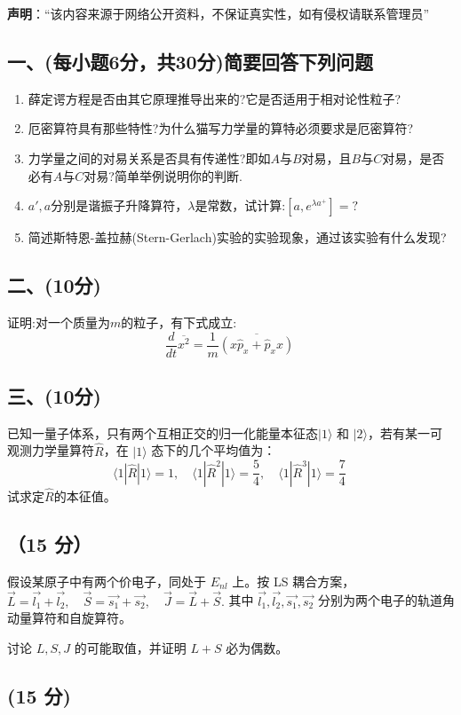 
\textbf{声明}：“该内容来源于网络公开资料，不保证真实性，如有侵权请联系管理员”

\subsection{一、(每小题6分，共30分)简要回答下列问题}
\begin{enumerate}
\item 薛定谔方程是否由其它原理推导出来的?它是否适用于相对论性粒子?
\item 厄密算符具有那些特性?为什么猫写力学量的算特必须要求是厄密算符?
\item 力学量之间的对易关系是否具有传递性?即如$A$与$B$对易，且$B$与$C$对易，是否必有$A$与$C$对易?简单举例说明你的判断.
\item $a',a$分别是谐振子升降算符，$\lambda$是常数，试计算:$\left[ a,e^{\lambda a^+} \right]=?$
\item 简述斯特恩-盖拉赫(Stern-Gerlach)实验的实验现象，通过该实验有什么发现?
\end{enumerate}
\subsection{二、(10分)}
证明:对一个质量为$m$的粒子，有下式成立:
$$\frac{d}{dt} \overline{x^2} = \frac{1}{m} \overline{\left( {x} \hat{p}_x + \hat{p}_x {x}\right)}~$$
\subsection{三、(10分)}
已知一量子体系，只有两个互相正交的归一化能量本征态$|1\rangle$ 和 $|2\rangle$，若有某一可观测力学量算符$\hat{R}$，在 $|1\rangle$ 态下的几个平均值为：
$$\langle 1|\hat{R}|1\rangle = 1,\quad \langle 1|\hat{R}^2|1\rangle = \frac{5}{4},\quad \langle 1|\hat{R}^3|1\rangle = \frac{7}{4}~$$
试求定$\hat{R}$的本征值。
\subsection{（15 分）}
假设某原子中有两个价电子，同处于 $E_{nl}$ 上。按 LS 耦合方案，
$\vec{L} = \vec{l_1} + \vec{l_2}, \quad \vec{S} = \vec{s_1} + \vec{s_2}, \quad \vec{J} = \vec{L} + \vec{S}.$
    其中 $\vec{l_1}, \vec{l_2}, \vec{s_1}, \vec{s_2}$ 分别为两个电子的轨道角动量算符和自旋算符。
    
    讨论 $L, S, J$ 的可能取值，并证明 $L + S$ 必为偶数。
\subsection{(15 分)}